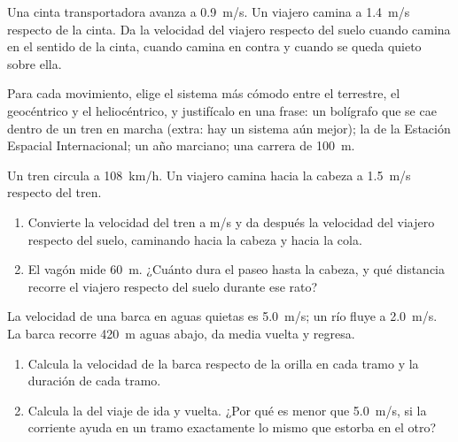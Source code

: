 \begin{exercise}[$\star$]\label{exo:g10:relative-motion:4}
Una cinta transportadora avanza a \qty{0.9}{m/s}. Un viajero camina a
\qty{1.4}{m/s} respecto de la cinta. Da la velocidad del viajero
respecto del suelo cuando camina en el sentido de la cinta, cuando
camina en contra y cuando se queda quieto sobre ella.
\end{exercise}

\begin{exercise}[$\star$]\label{exo:g10:relative-motion:5}
Para cada movimiento, elige el sistema más cómodo entre el terrestre, el
geocéntrico y el heliocéntrico, y justifícalo en una frase: un bolígrafo
que se cae dentro de un tren en marcha (extra: hay un sistema aún
mejor); la  de la Estación Espacial Internacional; un año
marciano; una carrera de \qty{100}{m}.
\end{exercise}

\begin{exercise}[$\star\star$]\label{exo:g10:relative-motion:6}
Un tren circula a \qty{108}{km/h}. Un viajero camina hacia la cabeza a
\qty{1.5}{m/s} respecto del tren.
\begin{enumerate}
  \item Convierte la velocidad del tren a \unit{m/s} y da después la
        velocidad del viajero respecto del suelo, caminando hacia la
        cabeza y hacia la cola.
  \item El vagón mide \qty{60}{m}. ¿Cuánto dura el paseo hasta la
        cabeza, y qué distancia recorre el viajero respecto del suelo
        durante ese rato?
\end{enumerate}
\end{exercise}

\begin{exercise}[$\star\star$]\label{exo:g10:relative-motion:7}
La velocidad de una barca en aguas quietas es \qty{5.0}{m/s}; un río
fluye a \qty{2.0}{m/s}. La barca recorre \qty{420}{m} aguas abajo, da
media vuelta y regresa.
\begin{enumerate}
  \item Calcula la velocidad de la barca respecto de la orilla en cada
        tramo y la duración de cada tramo.
  \item Calcula la  del viaje de ida y vuelta. ¿Por qué
        es menor que \qty{5.0}{m/s}, si la corriente ayuda en un tramo
        exactamente lo mismo que estorba en el otro?
\end{enumerate}
\end{exercise}

